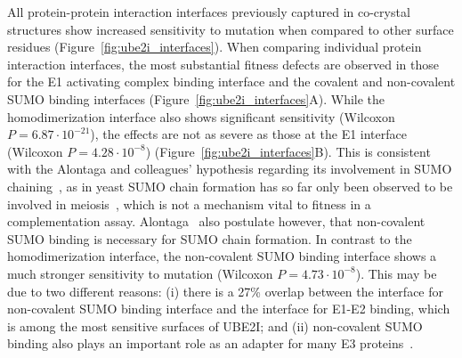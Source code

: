 All protein-protein interaction interfaces previously captured in co-crystal structures show increased sensitivity to mutation when compared to other surface residues (Figure~\ref{fig:ube2i_interfaces}). When comparing individual protein interaction interfaces, the most substantial fitness defects are observed in those for the E1 activating complex binding interface and the covalent and non-covalent SUMO binding interfaces (Figure~\ref{fig:ube2i_interfaces}A). While the homodimerization interface also shows significant sensitivity (Wilcoxon $P=6.87\cdot 10^{-21}$), the effects are not as severe as those at the E1 interface (Wilcoxon $P=4.28\cdot 10^{-8}$) (Figure~\ref{fig:ube2i_interfaces}B). This is consistent with the Alontaga and colleagues' hypothesis regarding its involvement in SUMO chaining~\cite{alontaga_rwd_2015}, as in yeast SUMO chain formation has so far only been observed to be involved in meiosis~\cite{cheng_sumo_2006}, which is not a mechanism vital to fitness in a complementation assay. Alontaga \etal\ also postulate however, that non-covalent SUMO binding is necessary for SUMO chain formation. In contrast to the homodimerization interface, the non-covalent SUMO binding interface shows a much stronger sensitivity to mutation (Wilcoxon $P=4.73\cdot 10^{-8}$). This may be due to two different reasons: (i) there is a 27\% overlap between the interface for non-covalent SUMO binding interface and the interface for E1-E2 binding, which is among the most sensitive surfaces of UBE2I; and (ii) non-covalent SUMO binding also plays an important role as an adapter for many E3 proteins~\cite{cappadocia_structural_2015}.


